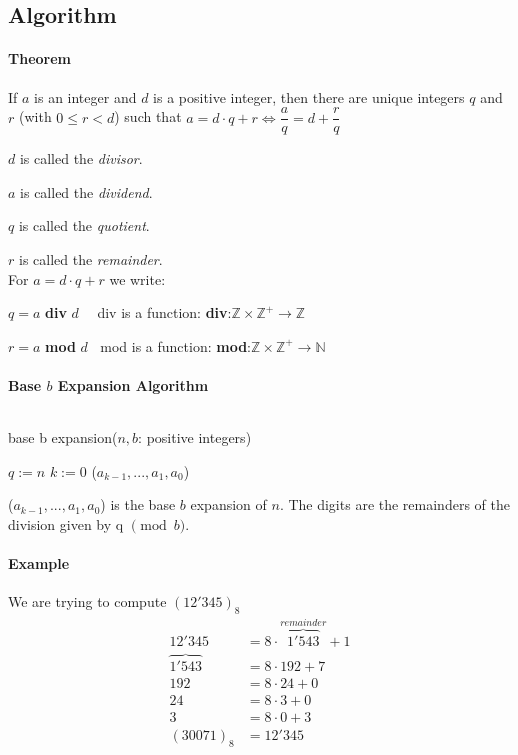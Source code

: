 \documentclass[10pt,a4paper]{book}
\newcommand{\N}{\mathbb{N}}
\newcommand{\Z}{\mathbb{Z}}
\begin{document}
\subsection{Algorithm}
\paragraph*{Theorem}
If $a$ is an integer and $d$ is a positive integer, then there are unique integers $q$ and $r$ (with $0 \leq r < d$) such that $a=d\cdot q + r \Leftrightarrow \dfrac{a}{q} = d+\dfrac{r}{q}$\par
$d$ is called the \textit{divisor}.\par
$a$ is called the \textit{dividend}.\par
$q$ is called the \textit{quotient}.\par
$r$ is called the \textit{remainder}.\\
For $a=d\cdot q + r$ we write:\par 
$q = a$ \textbf{div} $d\ \ \ \ \ \ $div is a function: \textbf{div}:$\Z\times\Z^+ \to \Z$\par 
$r = a$ \textbf{mod} $d\ \ \ \ $mod is a function: \textbf{mod}:$\Z\times\Z^+ \to \N$ \par 
\paragraph*{Base $b$ Expansion Algorithm}
$\ $\\
\begin{procedure}
\caption{base b expansion($n,b$: positive integers)}
\DontPrintSemicolon
\SetAlgoNoEnd
$q := n$\;
$k := 0$\;
\KwRet ($a_{k-1},...,a_1,a_0$)
\end{procedure}
{($a_{k-1},...,a_1,a_0$)} is the base $b$ expansion of $n$. The digits are the remainders of the division given by q $\pmod{b}$.
\paragraph*{Example}
We are trying to compute $(12'345)_8$
\begin{align*}
12'345 &= 8\cdot \overbrace{1'543}^{remainder} + 1\\
\overbrace{1'543} &= 8\cdot 192 + 7\\
192 &= 8\cdot 24 + 0\\
24 &= 8\cdot 3 + 0\\
3 &= 8\cdot 0 + 3\\
(30071)_8 &= 12'345
\end{align*}
\end{document}
